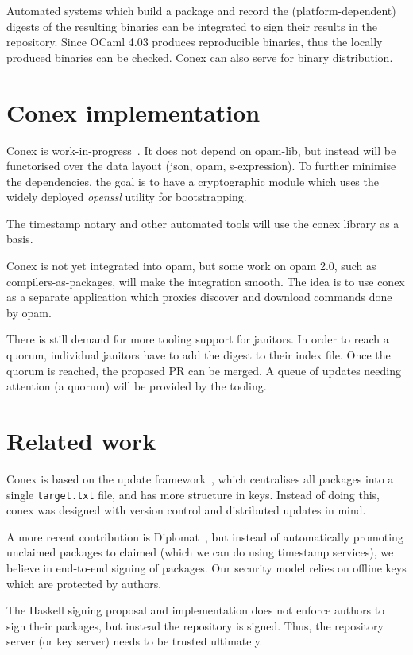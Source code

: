 \documentclass[nocopyrightspace]{sigplanconf}
\newcommand{\TODO}[1]{\textbf{[TODO: #1]}}
\begin{document}
Automated systems which build a package and record the (platform-dependent) digests of the resulting binaries can be integrated to sign their results in the repository.
Since OCaml 4.03 produces reproducible binaries, thus the locally produced binaries can be checked.
Conex can also serve for binary distribution.

\section{Conex implementation} \label{sec:implementation}

Conex is work-in-progress~\cite{conex}.
It does not depend on opam-lib, but instead will be functorised over the data layout (json, opam, s-expression).
To further minimise the dependencies, the goal is to have a cryptographic module which uses the widely deployed \emph{openssl} utility for bootstrapping.

The timestamp notary and other automated tools will use the conex library as a basis.

Conex is not yet integrated into opam, but some work on opam 2.0, such as compilers-as-packages, will make the integration smooth.
The idea is to use conex as a separate application which proxies discover and download commands done by opam.

There is still demand for more tooling support for janitors.
In order to reach a quorum, individual janitors have to add the digest to their index file.
Once the quorum is reached, the proposed PR can be merged.
A queue of updates needing attention (a quorum) will be provided by the tooling.

\section{Related work} \label{sec:related}
Conex is based on the update framework~\cite{tuf}, which centralises all packages into a single \texttt{target.txt} file, and has more structure in keys.
Instead of doing this, conex was designed with version control and distributed updates in mind.

A more recent contribution is Diplomat~\cite{diplomat}, but instead of automatically promoting unclaimed packages to claimed (which we can do using timestamp services), we believe in end-to-end signing of packages.
Our security model relies on offline keys which are protected by authors.

The Haskell signing proposal and implementation does not enforce authors to sign their packages, but instead the repository is signed.
Thus, the repository server (or key server) needs to be trusted ultimately.
\end{document}
